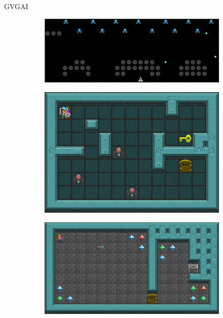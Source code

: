 \documentclass[11pt]{beamer}    %
\begin{document}
    \begin{frame}{GVGAI}
        \begin{figure}
            \centering
            \begin{subfigure}[t]{.5\textwidth}
                \centering
                \includegraphics[scale=0.2]{img/presentation/aliens}
            \end{subfigure}%
            \begin{subfigure}[t]{.5\textwidth}
                \centering
                \includegraphics[scale=0.2]{img/presentation/zelda}
            \end{subfigure}
            \par\bigskip
            \begin{subfigure}[t]{.5\textwidth}
                \centering
                \includegraphics[scale=0.2]{img/presentation/brainman}

\end{subfigure}
\end{figure}
\end{frame}
\end{document}
